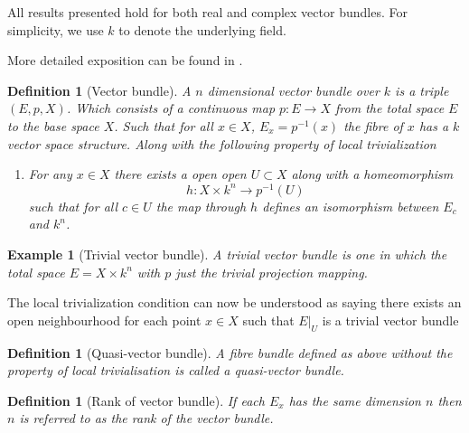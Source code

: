 \documentclass[12pt]{report}
\numberwithin{equation}{section}
\newtheorem{definition}[dummy]{Definition}
\newtheorem{example}[dummy]{Example}
\begin{document}
	All results presented hold for both real and complex vector bundles. For simplicity, we use $k$ to denote the underlying field. 
	
	More detailed exposition can be found in \cite{milnor1974characteristic, karoubi2008k}.
	
	\begin{definition}[Vector bundle]
		A $n$ dimensional vector bundle over $k$ is a triple $(E,p, X)$. Which consists of a continuous map $p:E \to X$ from the total space $E$ to the base space $X$. Such that for all $x \in X$, $E_x=p^{-1}(x)$ the fibre of $x$ has a $k$ vector space structure. Along with the following property of local trivialization
		\begin{enumerate}
			\item For any $x \in X$ there exists a open open $U \subset X$ along with a homeomorphism \[ h: X \times k^n	\to p^{-1}(U) \] such that for all $c \in U$ the map through $h$ defines an isomorphism between $E_c$ and $k^n$.
		\end{enumerate}
	\end{definition}
	\begin{example}[Trivial vector bundle]
		A trivial vector bundle is one in which the total space $E=X \times k^n$ with $p$ just the trivial projection mapping.
	\end{example}
	The local trivialization condition can now be understood as saying there exists an open neighbourhood for each point $x \in X$ such that $E|_U$ is a trivial vector bundle
	\begin{definition}[Quasi-vector bundle]
		A fibre bundle defined as above without the property of local trivialisation is called a quasi-vector bundle.
	\end{definition}
	\begin{definition}[Rank of vector bundle]
		If each $E_x$ has the same dimension $n$ then $n$ is referred to as the rank of the vector bundle.
	\end{definition}
	
\end{document}
